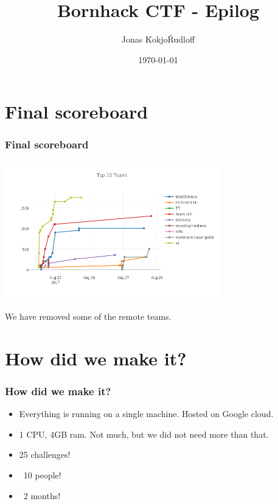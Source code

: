 \documentclass{beamer}
\begin{document}
\title{Bornhack CTF - Epilog}

\author{Jonas \'Kokjo\' Rudloff}
\date{\today} 


\frame{\frametitle{}\tableofcontents} 

\section{Final scoreboard}
\begin{frame}
    \frametitle{Final scoreboard}

    \includegraphics[height=6cm]{scoreboard.png}

    We have removed some of the remote teams.
\end{frame}

\begin{frame}
\end{frame}

\section{How did we make it?}
\begin{frame}
    \frametitle{How did we make it?}
    \begin{itemize}
        \item Everything is running on a single machine. Hosted on Google cloud.
        \item 1 CPU, 4GB ram. Not much, but we did not need more than that.
        \item 25 challenges!
        \item ~10 people!
        \item ~2 months!
    \end{itemize}
\end{frame}
\end{document}

